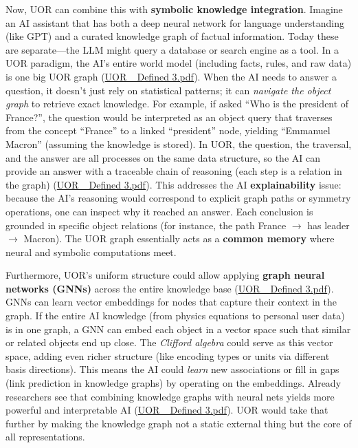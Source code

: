 \documentclass[12pt]{article}
\begin{document}
Now, UOR can combine this with \textbf{symbolic knowledge integration}. Imagine an AI assistant that has both a deep neural network for language understanding (like GPT) and a curated knowledge graph of factual information. Today these are separate---the LLM might query a database or search engine as a tool. In a UOR paradigm, the AI’s entire world model (including facts, rules, and raw data) is one big UOR graph (\href{file://file-3oEyMHjK5WgHWfYmLyzhts#:~:text=%E2%97%8F%20Artificial%20Intelligence%20Integration%3A%20In,Consider%20an}{UOR\_ Defined 3.pdf}). When the AI needs to answer a question, it doesn’t just rely on statistical patterns; it can \emph{navigate the object graph} to retrieve exact knowledge. For example, if asked ``Who is the president of France?'', the question would be interpreted as an object query that traverses from the concept ``France'' to a linked ``president'' node, yielding ``Emmanuel Macron'' (assuming the knowledge is stored). In UOR, the question, the traversal, and the answer are all processes on the same data structure, so the AI can provide an answer with a traceable chain of reasoning (each step is a relation in the graph) (\href{file://file-3oEyMHjK5WgHWfYmLyzhts#:~:text=the%20graph%20structure%E2%80%99s%20interconnectivity%20enables,built%20on%20UOR%20that%20combines}{UOR\_ Defined 3.pdf}). This addresses the AI \textbf{explainability} issue: because the AI’s reasoning would correspond to explicit graph paths or symmetry operations, one can inspect why it reached an answer. Each conclusion is grounded in specific object relations (for instance, the path France $\rightarrow$ has leader $\rightarrow$ Macron). The UOR graph essentially acts as a \textbf{common memory} where neural and symbolic computations meet.

\medskip

Furthermore, UOR’s uniform structure could allow applying \textbf{graph neural networks (GNNs)} across the entire knowledge base (\href{file://file-3oEyMHjK5WgHWfYmLyzhts#:~:text=ensuring%20factual%20consistency,the%20universal%20format%20that%20these}{UOR\_ Defined 3.pdf}). GNNs can learn vector embeddings for nodes that capture their context in the graph. If the entire AI knowledge (from physics equations to personal user data) is in one graph, a GNN can embed each object in a vector space such that similar or related objects end up close. The \emph{Clifford algebra} could serve as this vector space, adding even richer structure (like encoding types or units via different basis directions). This means the AI could \emph{learn} new associations or fill in gaps (link prediction in knowledge graphs) by operating on the embeddings. Already researchers see that combining knowledge graphs with neural nets yields more powerful and interpretable AI (\href{file://file-3oEyMHjK5WgHWfYmLyzhts#:~:text=knowledge%20graphs%20have%20sparked%20a,learning%20coexist%20on%20the%20same}{UOR\_ Defined 3.pdf}). UOR would take that further by making the knowledge graph not a static external thing but the core of all representations.
\end{document}

